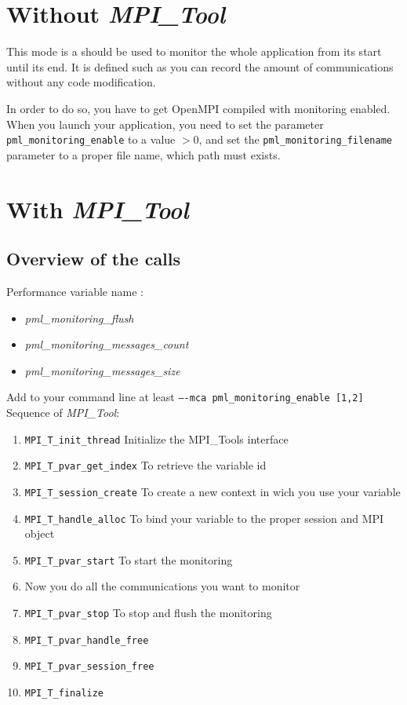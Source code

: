 \documentclass[notitlepage]{article}
\newcommand{\mpit}[1]{\textit{MPI\_Tool#1}}
\begin{document}
\section{Without \mpit{}}

This mode is a should be used to monitor the whole application from
its start until its end. It is defined such as you can record the
amount of communications without any code modification.

In order to do so, you have to get OpenMPI compiled with monitoring
enabled. When you launch your application, you need to set the
parameter \texttt{pml\_monitoring\_enable} to a value $> 0$, and set
the \texttt{pml\_monitoring\_filename} parameter to a proper file name,
which path must exists.

\section{With \mpit{}}

\subsection{Overview of the calls}

Performance variable name :
\begin{itemize}
\item \textit{pml\_monitoring\_flush}
\item \textit{pml\_monitoring\_messages\_count}
\item \textit{pml\_monitoring\_messages\_size}
\end{itemize}
Add to your command line at least \texttt{----mca pml\_monitoring\_enable [1,2]} \\
Sequence of \mpit{}:
\begin{enumerate}
\item {\texttt{MPI\_T\_init\_thread}} Initialize the MPI\_Tools
  interface
\item {\texttt{MPI\_T\_pvar\_get\_index}} To retrieve the variable id
\item {\texttt{MPI\_T\_session\_create}} To create a new context
  in wich you use your variable
\item {\texttt{MPI\_T\_handle\_alloc}} To bind your variable to the
  proper session and MPI object
\item {\texttt{MPI\_T\_pvar\_start}} To start the monitoring
\item Now you do all the communications you want to monitor
\item {\texttt{MPI\_T\_pvar\_stop}} To stop and flush the monitoring
\item {\texttt{MPI\_T\_pvar\_handle\_free}}
\item {\texttt{MPI\_T\_pvar\_session\_free}}
\item {\texttt{MPI\_T\_finalize}}
\end{enumerate}
\end{document}
